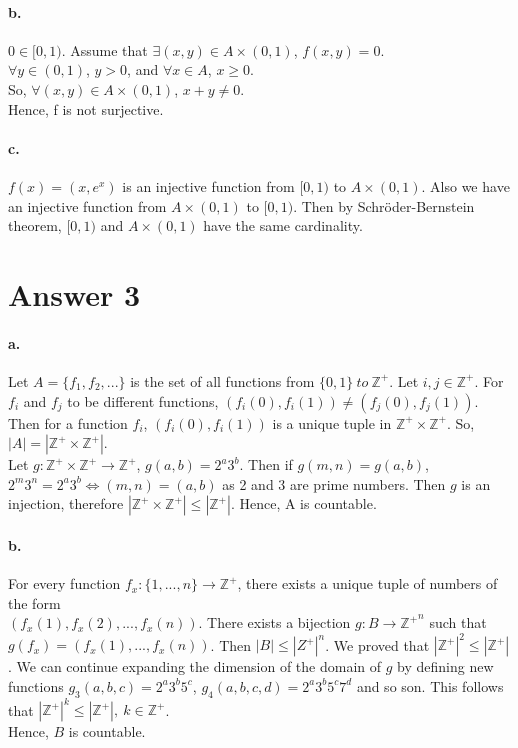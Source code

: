 \documentclass[11pt]{article}
\begin{document}
\paragraph{b.}
    $0 \in [0,1)$. Assume that $\exists (x,y) \in A \times (0,1)$, $f(x,y) = 0$.\\
    $\forall y \in (0,1)$, $y>0$, and $\forall x \in A$, $x\geq 0$.\\ So, $\forall (x,y) \in A \times (0,1)$, $x+y \neq 0$. \\
    Hence, f is not surjective.
\paragraph{c.}
    $f(x) = (x,e^x)$ is an injective function from $[0,1)$ to $A \times (0,1)$. Also we have an injective function from $A \times (0,1)$ to $[0,1)$. Then by Schröder-Bernstein theorem, $[0,1)$ and $A \times (0,1)$ have the same cardinality.

\section*{Answer 3}
\paragraph{a.}
    Let $A = \{f_1,f_2,...\}$ is the set of all functions from $\{0,1\} \ to \  \mathbb{Z^+}$. 
    Let $i,j \in \mathbb{Z^+}$. For $f_i$ and $f_j$ to be different functions, $(f_i(0),f_i(1)) \neq (f_j(0),f_j(1))$. 
    Then for a function $f_i$, $(f_i(0),f_i(1))$ is a unique tuple in $\mathbb{Z^+}\times\mathbb{Z^+} $. So, $|A|=|\mathbb{Z^+}\times \mathbb{Z^+}|$.\\ 
    Let $g:\mathbb{Z^+}\times\mathbb{Z^+} \rightarrow \mathbb{Z^+}$, $g(a,b) = 2^a3^b$. Then if $g(m,n) = g(a,b)$, $2^m3^n = 2^a3^b \Leftrightarrow (m,n)=(a,b)$ as 2 and 3 are prime numbers. Then $g$ is an injection, therefore  $|\mathbb{Z^+}\times \mathbb{Z^+}| \leq |\mathbb{Z^+}|$. Hence, A is countable. 
\paragraph{b.}
    For every function $f_x:\{1,...,n\} \rightarrow \mathbb{Z^+}$, there exists a unique tuple of numbers of the form \\$(f_x(1), f_x(2),...,f_x(n))$. There exists a bijection $g:B \rightarrow \mathbb{Z^+}^n$ such that $g(f_x) = (f_x(1),...,f_x(n))$. Then $|B|\leq|{Z^+}|^n$. We proved that $|\mathbb{Z^+}|^2 \leq |\mathbb{Z^+}|$. We can continue expanding the dimension of the domain of $g$ by defining new functions $g_3(a,b,c)=2^a3^b5^c$, $g_4(a,b,c,d) = 2^a3^b5^c7^d$ and so son. This follows that $|\mathbb{Z^+}|^k \leq |\mathbb{Z^+}|,\ k \in \mathbb{Z^+}$.\\
    Hence, $B$ is countable.
\end{document}
